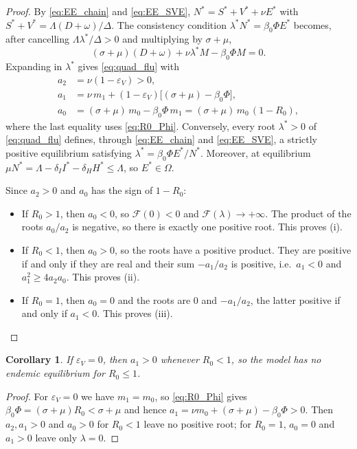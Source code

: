 \documentclass[12pt,a4paper]{article}
\newtheorem{corollary}[theorem]{Corollary}
\theoremstyle{definition}
\theoremstyle{remark}
\begin{document}
\begin{proof}
By \eqref{eq:EE_chain} and \eqref{eq:EE_SVE}, $N^*=S^*+V^*+\nu E^*$ with
$S^*+V^*=\Lambda(D+\omega)/\Delta$. The consistency condition
$\lambda^*N^*=\beta_0\Phi E^*$ becomes, after cancelling $\Lambda\lambda^*/\Delta>0$
and multiplying by $\sigma+\mu$,
\[
(\sigma+\mu)(D+\omega)+\nu\lambda^*M-\beta_0\Phi M=0 .
\]
Expanding in $\lambda^*$ gives \eqref{eq:quad_flu} with
\begin{equation}\label{eq:coeffs_flu}
\begin{aligned}
a_2&=\nu(1-\varepsilon_V)>0,\\
a_1&=\nu\,m_1+(1-\varepsilon_V)\bigl[(\sigma+\mu)-\beta_0\Phi\bigr],\\
a_0&=(\sigma+\mu)\,m_0-\beta_0\Phi\,m_1=(\sigma+\mu)\,m_0\,(1-R_0),
\end{aligned}
\end{equation}
where the last equality uses \eqref{eq:R0_Phi}. Conversely, every root
$\lambda^*>0$ of \eqref{eq:quad_flu} defines, through \eqref{eq:EE_chain} and
\eqref{eq:EE_SVE}, a strictly positive equilibrium satisfying
$\lambda^*=\beta_0\Phi E^*/N^*$. Moreover, at equilibrium
$\mu N^*=\Lambda-\delta_II^*-\delta_HH^*\le\Lambda$, so $E^*\in\Omega$.


Since $a_2>0$ and $a_0$ has the sign of $1-R_0$:
\begin{itemize}
\item If $R_0>1$, then $a_0<0$, so $\mathcal F(0)<0$ and $\mathcal F(\lambda)\to+\infty$.
The product of the roots $a_0/a_2$ is negative, so there is exactly one positive
root. This proves (i).
\item If $R_0<1$, then $a_0>0$, so the roots have a positive product. They are
positive if and only if they are real and their sum $-a_1/a_2$ is positive, i.e.\
$a_1<0$ and $a_1^2\ge4a_2a_0$. This proves (ii).
\item If $R_0=1$, then $a_0=0$ and the roots are $0$ and $-a_1/a_2$, the latter
positive if and only if $a_1<0$. This proves (iii).
\end{itemize}
\end{proof}

\begin{corollary}\label{cor:no_backward}
If $\varepsilon_V=0$, then $a_1>0$ whenever $R_0<1$, so the model has no
endemic equilibrium for $R_0\le 1$.
\end{corollary}

\begin{proof}
For $\varepsilon_V=0$ we have $m_1=m_0$, so \eqref{eq:R0_Phi} gives
$\beta_0\Phi=(\sigma+\mu)R_0<\sigma+\mu$ and hence
$a_1=\nu m_0+(\sigma+\mu)-\beta_0\Phi>0$. Then $a_2,a_1>0$ and $a_0>0$ for $R_0<1$
leave no positive root; for $R_0=1$, $a_0=0$ and $a_1>0$ leave only $\lambda=0$.
\end{proof}
\end{document}
